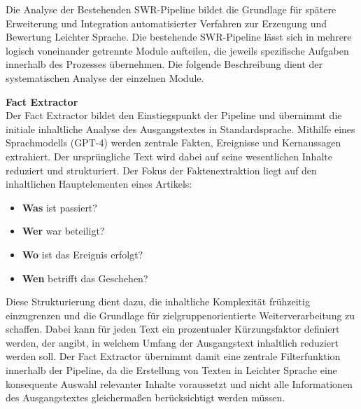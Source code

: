 
Die Analyse der Bestehenden SWR-Pipeline bildet die Grundlage für spätere Erweiterung und Integration automatisierter Verfahren zur Erzeugung und Bewertung Leichter Sprache.
Die bestehende SWR-Pipeline lässt sich in mehrere logisch voneinander getrennte Module aufteilen, die jeweils spezifische Aufgaben innerhalb des Prozesses übernehmen. Die folgende Beschreibung dient der systematischen Analyse der einzelnen Module.

\textbf{Fact Extractor}\\
Der Fact Extractor bildet den Einstiegspunkt der Pipeline und übernimmt die initiale inhaltliche Analyse des Ausgangstextes in Standardsprache.
Mithilfe eines Sprachmodells (GPT-4) werden zentrale Fakten, Ereignisse und Kernaussagen extrahiert.
Der ursprüngliche Text wird dabei auf seine wesentlichen Inhalte reduziert und strukturiert.
Der Fokus der Faktenextraktion liegt auf den inhaltlichen Hauptelementen eines Artikels:
\begin{itemize}[label=\textbullet, nosep]
	\item \textbf{Was} ist passiert?
	\item \textbf{Wer} war beteiligt?
	\item \textbf{Wo} ist das Ereignis erfolgt?
	\item \textbf{Wen} betrifft das Geschehen?
\end{itemize}
Diese Strukturierung dient dazu, die inhaltliche Komplexität frühzeitig einzugrenzen und die Grundlage für zielgruppenorientierte Weiterverarbeitung zu schaffen.
Dabei kann für jeden Text ein prozentualer Kürzungsfaktor definiert werden, der angibt, in welchem Umfang der Ausgangstext inhaltlich reduziert werden soll.
Der Fact Extractor übernimmt damit eine zentrale Filterfunktion innerhalb der Pipeline, da die Erstellung von Texten in Leichter Sprache eine konsequente Auswahl relevanter Inhalte voraussetzt und nicht alle Informationen des Ausgangstextes gleichermaßen berücksichtigt werden müssen.

